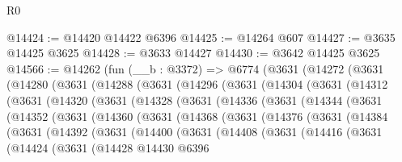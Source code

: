 \begin{lexlean}{R0}
\begin{coremodule}
@14424 := @14420 @14422 @6396
@14425 := @14264 @607
@14427 := @3635 @14425 @3625
@14428 := @3633 @14427
@14430 := @3642 @14425 @3625
@14566 := @14262
    (fun (__b : @3372) =>
    @6774
      (@3631
        (@14272
          (@3631
            (@14280
              (@3631
                (@14288
                  (@3631
                    (@14296
                      (@3631
                        (@14304
                          (@3631
                            (@14312
                              (@3631
                                (@14320
                                  (@3631
                                    (@14328
                                      (@3631
                                        (@14336
                                          (@3631
                                            (@14344
                                              (@3631
                                                (@14352
                                                  (@3631
                                                    (@14360
                                                      (@3631
                                                        (@14368
                                                          (@3631
                                                            (@14376
                                                              (@3631
                                                                (@14384
                                                                  (@3631
                                                                    (@14392
                                                                      (@3631
                                                                        (@14400
                                                                          (@3631
                                                                            (@14408
                                                                              (@3631
                                                                                (@14416
                                                                                  (@3631
                                                                                    (@14424
                                                                                      (@3631
                                                                                        (@14428
                                                                                          @14430
                                                                                          @6396

\end{coremodule}
\end{lexlean}
